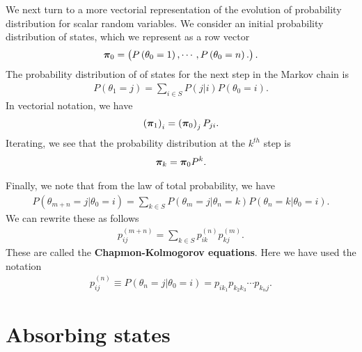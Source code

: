 We next turn to a more vectorial representation of the evolution of probability distribution for scalar random variables.
We consider an initial probability distribution of states, which we represent as a row vector 
\begin{align}
    {\bm \pi}_0
    =
    \begin{pmatrix}
        P\left(\theta_0=1\right),\cdots,P\left(\theta_0=n\right)
        .
    \end{pmatrix}
    .
\end{align}
The probability distribution of of states for the next step in the Markov chain is 
\begin{align}
    P\left(\theta_1=j\right) 
    =
    \sum_{i\in S} P\left(j|i\right) P\left(\theta_0=i\right)
    .
\end{align}
In vectorial notation, we have
\begin{align}
    \left({\bm \pi}_1\right)_i = \left({\bm \pi}_0\right)_j P_{ji}
    .
\end{align}
Iterating, we see that the probability distribution at the $k^{th}$ step is
\begin{align}
    {\bm \pi}_k
    =
    {\bm \pi}_0 P^k
    .
\end{align}

Finally, we note that from the law of total probability, we have
\begin{align}
    P\left(\theta_{m+n}=j|\theta_0=i\right)
    =
    \sum_{k\in S} 
        P\left(\theta_{m}=j|\theta_n=k\right)
        P\left(\theta_{n}=k|\theta_0=i\right)
    .
\end{align}
We can rewrite these as follows
\begin{align}
    \label{eq:Chapman-Kolmogorov-eqns}
    p^{(m+n)}_{ij} 
    =
    \sum_{k\in S} p^{(n)}_{ik}p^{(m)}_{kj}
    .
\end{align}
These are called the \textbf{Chapmon-Kolmogorov equations}.
Here we have used the notation 
\begin{align}
    p^{(n)}_{ij}
    \equiv
    P\left(\theta_{n}=j|\theta_0=i\right) 
    =
    p_{ik_1}p_{k_2k_3}\cdots p_{k_nj}
    .
\end{align}

\section{Absorbing states  \label{sec:absorbing-states}}


